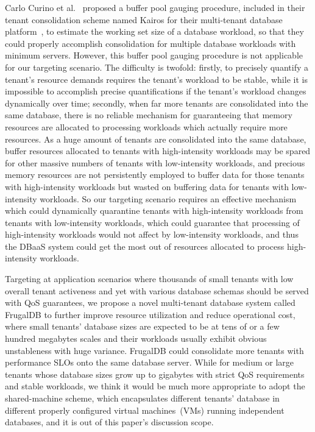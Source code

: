 Carlo Curino et al.~\cite{Workload-Aware} proposed a buffer pool gauging procedure, included in their tenant consolidation scheme named Kairos for their multi-tenant database platform~\cite{Relational}, to estimate the working set size of a database workload, so that they could properly accomplish consolidation for multiple database workloads with minimum servers. However, this buffer pool gauging procedure is not applicable for our targeting scenario. The difficulty is twofold: firstly, to precisely quantify a tenant's resource demands requires the tenant's workload to be stable, while it is impossible to accomplish precise quantifications if the tenant's workload changes dynamically over time; secondly, when far more tenants are consolidated into the same database, there is no reliable mechanism for guaranteeing that memory resources are allocated to processing workloads which actually require more resources. As a huge amount of tenants are consolidated into the same database, buffer resources allocated to tenants with high-intensity workloads may be spared for other massive numbers of tenants with low-intensity workloads, and precious memory resources are not persistently employed to buffer data for those tenants with high-intensity workloads but wasted on buffering data for tenants with low-intensity workloads. So our targeting scenario requires an effective mechanism which could dynamically quarantine tenants with high-intensity workloads from tenants with low-intensity workloads, which could guarantee that processing of high-intensity workloads would not affect by low-intensity workloads, and thus the DBaaS system could get the most out of resources allocated to process high-intensity workloads.

Targeting at application scenarios where thousands of small tenants with low overall tenant activeness and yet with various database schemas should be served with QoS guarantees, we propose a novel multi-tenant database system called FrugalDB to further improve resource utilization and reduce operational cost, where small tenants' database sizes are expected to be at tens of or a few hundred megabytes scales and their workloads usually exhibit obvious unstableness with huge variance. FrugalDB could consolidate more tenants with performance SLOs onto the same database server. While for medium or large tenants whose database sizes grow up to gigabytes with strict QoS requirements and stable workloads, we think it would be much more appropriate to adopt the shared-machine scheme, which encapsulates different tenants' database in different properly configured virtual machines~(VMs) running independent databases, and it is out of this paper's discussion scope.

